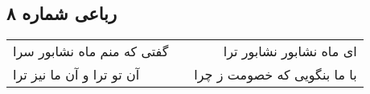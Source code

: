 \begin{center}
\section*{رباعی شماره ۸}
\label{sec:sh008}
\begin{longtable}{l p{0.5cm} r}
گفتی که منم ماه نشابور سرا
&&
ای ماه نشابور نشابور ترا
\\
آن تو ترا و آن ما نیز ترا
&&
با ما بنگویی که خصومت ز چرا
\\
\end{longtable}
\end{center}
